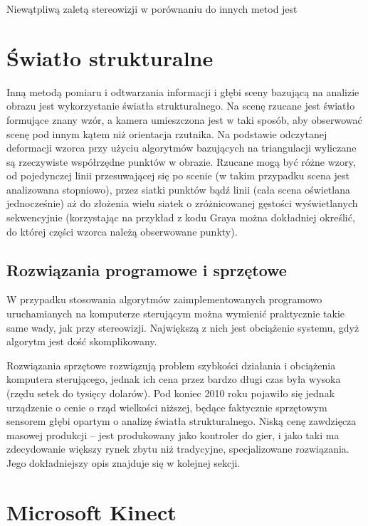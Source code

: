 Niewątpliwą zaletą stereowizji w porównaniu do innych metod jest

\section{Światło strukturalne}

Inną metodą pomiaru i odtwarzania informacji i głębi sceny bazującą na analizie
obrazu jest wykorzystanie światła strukturalnego. Na scenę rzucane jest światło
formujące znany wzór, a kamera umieszczona jest w taki sposób, aby obserwować
scenę pod innym kątem niż orientacja rzutnika. Na podstawie odczytanej deformacji
wzorca przy użyciu algorytmów bazujących na triangulacji wyliczane są rzeczywiste
współrzędne punktów w obrazie. Rzucane mogą być różne wzory, od pojedynczej linii
przesuwającej się po scenie (w takim przypadku scena jest analizowana stopniowo),
przez siatki punktów bądź linii (cała scena oświetlana jednocześnie) aż do złożenia
wielu siatek o zróżnicowanej gęstości wyświetlanych sekwencyjnie (korzystając
na przykład z kodu Graya można dokładniej określić, do której części wzorca należą
obserwowane punkty).

\subsection{Rozwiązania programowe i sprzętowe}

W przypadku stosowania algorytmów zaimplementowanych programowo uruchamianych na
komputerze sterującym można wymienić praktycznie takie same wady, jak przy stereowizji.
Największą z nich jest obciążenie systemu, gdyż algorytm jest dość skomplikowany.

Rozwiązania sprzętowe rozwiązują problem szybkości działania i obciążenia
komputera sterującego, jednak ich cena przez bardzo długi czas była wysoka
(rzędu setek do tysięcy dolarów). Pod koniec 2010 roku pojawiło się jednak urządzenie
o cenie o rząd wielkości niższej, będące faktycznie sprzętowym sensorem głębi 
opartym o analizę światła strukturalnego. Niską cenę zawdzięcza masowej produkcji
-- jest produkowany jako kontroler do gier, i jako taki ma zdecydowanie większy
rynek zbytu niż tradycyjne, specjalizowane rozwiązania. Jego dokładniejszy opis
znajduje się w kolejnej sekcji.

\section{Microsoft Kinect}

